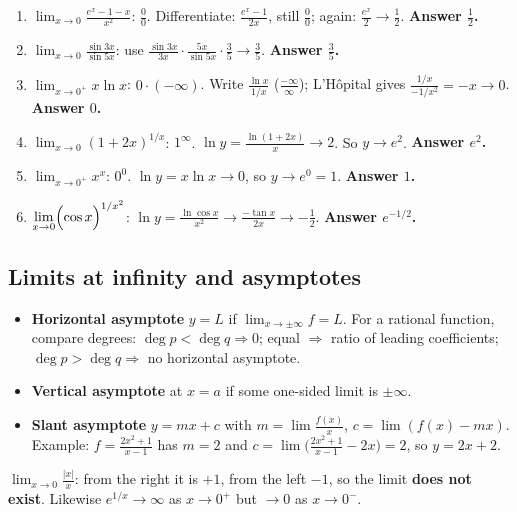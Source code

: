 \documentclass[11pt,a4paper]{article}
\begin{document}
\begin{example}
\begin{enumerate}[leftmargin=*,itemsep=5pt]
\item $\displaystyle\lim_{x\to0}\frac{e^x-1-x}{x^2}$: $\frac00$. Differentiate: $\frac{e^x-1}{2x}$, still $\frac00$; again: $\frac{e^x}{2}\to\frac12$. \textbf{Answer $\frac12$.}
\item $\displaystyle\lim_{x\to0}\frac{\sin3x}{\sin5x}$: use $\frac{\sin3x}{3x}\cdot\frac{5x}{\sin5x}\cdot\frac35\to\frac35$. \textbf{Answer $\frac35$.}
\item $\displaystyle\lim_{x\to0^+}x\ln x$: $0\cdot(-\infty)$. Write $\frac{\ln x}{1/x}$ ($\frac{-\infty}{\infty}$); L'H\^opital gives $\frac{1/x}{-1/x^2}=-x\to0$. \textbf{Answer $0$.}
\item $\displaystyle\lim_{x\to0}(1+2x)^{1/x}$: $1^\infty$. $\ln y=\frac{\ln(1+2x)}{x}\to2$. So $y\to e^2$. \textbf{Answer $e^2$.}
\item $\displaystyle\lim_{x\to0^+}x^x$: $0^0$. $\ln y=x\ln x\to0$, so $y\to e^0=1$. \textbf{Answer $1$.}
\item $\displaystyle\lim_{x\to0}\Bigl(\cos x\Bigr)^{1/x^2}$: $\ln y=\frac{\ln\cos x}{x^2}\to\frac{-\tan x}{2x}\to-\frac12$. \textbf{Answer $e^{-1/2}$.}
\end{enumerate}
\end{example}

\subsection{Limits at infinity and asymptotes}
\begin{itemize}[noitemsep]
\item \textbf{Horizontal asymptote} $y=L$ if $\lim_{x\to\pm\infty}f=L$. For a rational function, compare degrees: $\deg p<\deg q\Rightarrow0$; equal $\Rightarrow$ ratio of leading coefficients; $\deg p>\deg q\Rightarrow$ no horizontal asymptote.
\item \textbf{Vertical asymptote} at $x=a$ if some one-sided limit is $\pm\infty$.
\item \textbf{Slant asymptote} $y=mx+c$ with $m=\lim\frac{f(x)}{x}$, $c=\lim(f(x)-mx)$. Example: $f=\frac{2x^2+1}{x-1}$ has $m=2$ and $c=\lim\bigl(\frac{2x^2+1}{x-1}-2x\bigr)=2$, so $y=2x+2$.
\end{itemize}

\begin{example}
$\displaystyle\lim_{x\to0}\frac{|x|}{x}$: from the right it is $+1$, from the left $-1$, so the limit \textbf{does not exist}. Likewise $e^{1/x}\to\infty$ as $x\to0^+$ but $\to0$ as $x\to0^-$.
\end{example}
\end{document}
